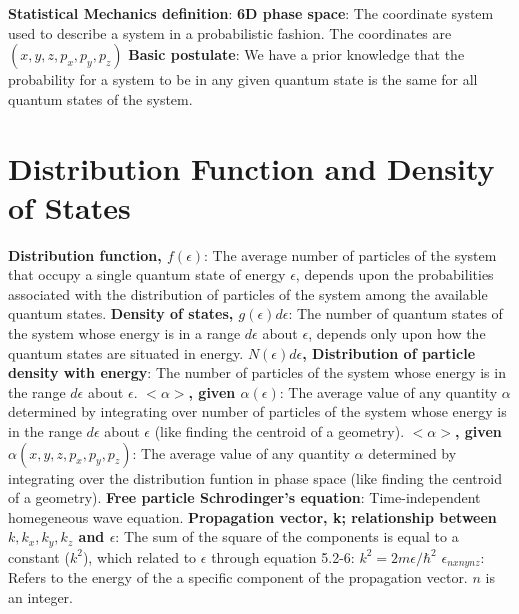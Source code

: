 \documentclass{article}
\numberwithin{equation}{section}
\begin{document}
\textbf{Statistical Mechanics definition}:
\newline
\textbf{6D phase space}: The coordinate system used to describe a system in a probabilistic fashion. The coordinates are $(x,y,z,p_x,p_y,p_z)$
\newline
\textbf{Basic postulate}: We have a prior knowledge that the probability for a system to be in any given quantum state is the same for all quantum states of the system.
\newline
\section*{Distribution Function and Density of States}
\textbf{Distribution function, $f(\epsilon)$}: The average number of particles of the system that occupy a single quantum state of energy $\epsilon$, depends upon the probabilities associated with the distribution of particles of the system among the available quantum states.
\newline
\textbf{Density of states, $g(\epsilon)d\epsilon$}: The number of quantum states of the system whose energy is in a range $d\epsilon$ about $\epsilon$, depends only upon how the quantum states are situated in energy.
\newline
\textbf{$N(\epsilon)d\epsilon$, Distribution of particle density with energy}: The number of particles of the system whose energy is in the range $d\epsilon$ about $\epsilon$.
\newline
\textbf{$<\alpha>$, given $ \alpha(\epsilon)$}: The average value of any quantity $\alpha$ determined by integrating over number of particles of the system whose energy is in the range $d\epsilon$ about $\epsilon$ (like finding the centroid of a geometry).
\newline
\textbf{$<\alpha>$, given  $\alpha(x,y,z,p_x,p_y,p_z)$}: The average value of any quantity $\alpha$ determined by integrating over the distribution funtion in phase space (like finding the centroid of a geometry).
\newline
\textbf{Free particle Schrodinger's equation}: Time-independent homegeneous wave equation. 
\newline
\textbf{Propagation vector, k; relationship between $k, k_x, k_y, k_z$ and $\epsilon$}: The sum of the square of the components is equal to a constant ($k^2$), which related to $\epsilon$ through equation 5.2-6: $k^2=2m\epsilon/\hbar^2$ 
\newline
\textbf{$\epsilon_{nxnynz}$}: Refers to the energy of the a specific component of the propagation vector. $n$ is an integer.
\end{document}
